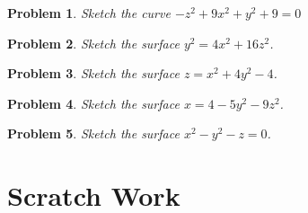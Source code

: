 \documentclass[11pt]{article}
\newtheorem{problem}{Problem}
\begin{document}
\vspace{7cm}

\begin{problem}
    Sketch the curve $-z^2+9x^2+y^2+9=0$
\end{problem}

\vspace{6.5cm}

\begin{problem}
    Sketch the surface $y^2 = 4x^2+16z^2$.
\end{problem}

\vspace{6.5cm}

\begin{problem}
    Sketch the surface $z = x^2+4y^2-4$.
\end{problem}

\vspace{6.5cm}

\begin{problem}
    Sketch the surface $x = 4-5y^2-9z^2$.
\end{problem}

\vspace{9cm}

\begin{problem}
    Sketch the surface $x^2-y^2-z=0$.
\end{problem}

\newpage

\section{Scratch Work}
\end{document}
